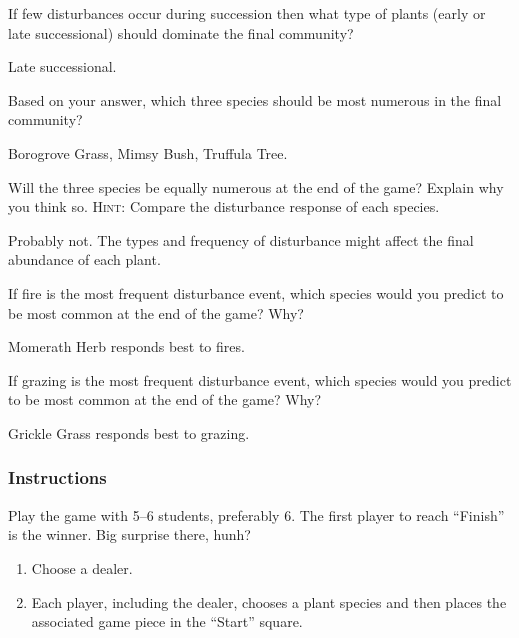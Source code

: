 \documentclass[12pt, hidelinks]{exam}
\newcommand*\AnswerBox[2]{%
    \parbox[t][#1]{0.92\textwidth}{%
    \begin{solution}#2\end{solution}}
    \vspace{\stretch{1}}
}
\newlength{\basespace}
\begin{document}
\begin{questions}

\question \label{ques:hypothesis}
If few disturbances occur during succession then what type of plants (early or late successional) should dominate the final community?

\AnswerBox{0.35\basespace}{Late successional.}

\question
Based on your answer, which three species should be most numerous in the final community? 

\AnswerBox{0.35\basespace}{Borogrove Grass, Mimsy Bush, Truffula Tree.}


\question
Will the three species be equally numerous at the end of the game? Explain why you think so.
 \textsc{Hint:} Compare the disturbance response of each species. 

\AnswerBox{0.35\basespace}{Probably not. The types and frequency of disturbance might affect the
	final abundance of each plant.}

\question
If fire is the most frequent disturbance event, which species would you predict to be most common at the end of the game? Why?

\AnswerBox{0.35\basespace}{Momerath Herb responds best to fires.}

\begin{samepage}
	
\question
If grazing is the most frequent disturbance event, which species would you predict to be most common at the end of the game?  Why?

\AnswerBox{0.35\basespace}{Grickle Grass responds best to grazing.}

\subsubsection*{Instructions}

Play the game with 5–6 students, preferably 6. The first player 
to reach “Finish” is the winner. Big surprise there, hunh?

\end{samepage}

\begin{enumerate}
	
	\item Choose a dealer. 
	
	\item Each player, including the dealer, chooses a plant species and then
	places the associated game piece in the “Start” square.
	

\end{enumerate}
\end{questions}
\end{document}
